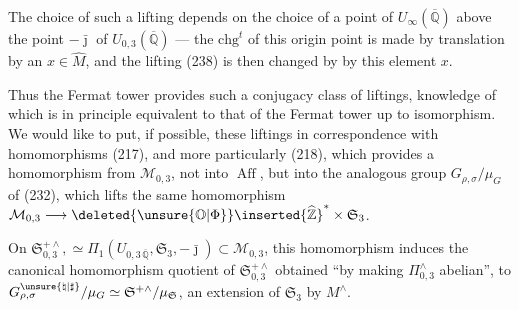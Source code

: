 The choice of such a lifting depends on the choice of a point of
$U_\infty(\overline{\mathbb Q})$ above the point $-\bar{\jmath}$
of $U_{0,3}(\overline{\mathbb Q})$ --- the $\mathrm{chg}^{t}$ of this
origin point is made by translation by an $x\in\widehat M$,
and the lifting (238) is then changed by 
by this element $x$.

Thus the Fermat tower provides such a conjugacy class
of liftings, knowledge of which is in principle equivalent
to that of the Fermat tower up to isomorphism. We would like to put,
if possible, these liftings in correspondence with
 homomorphisms (217), and more particularly
 (218), which provides a
 homomorphism from $\mathcal M_{0,3}$, not into
 $\operatorname{Aff}$, but into
the analogous group $G_{\rho,\sigma}/\mu_G$ of (232), which lifts
the same homomorphism
$\mathcal M_{0,3}\longrightarrow
\deleted{\unsure{\mathbb O|\Phi}}\inserted{\widehat{\mathbb Z}}^{*}\times\mathfrak S_3$.




On $\mathfrak S_{0,3}^{+\wedge},\simeq
\Pi_1(U_{0,3\,\overline{\mathbb Q}},\mathfrak S_3,-\bar{\jmath})
\subset\mathcal M_{0,3}$,
this homomorphism induces the canonical homomorphism
 quotient of $\mathfrak S_{0,3}^{+\wedge}$
obtained ``by making $\Pi_{0,3}^\wedge$ abelian'',
to $G_{\rho,\sigma}^{\unsure{\natural|\sharp}}/\mu_G
\simeq\mathfrak S^{+\wedge}/\mu_{\mathfrak S}$, an extension of
$\mathfrak S_3$
by $M^\wedge$.

